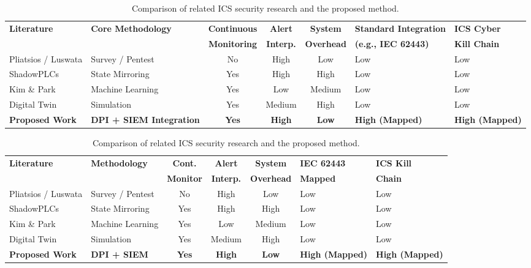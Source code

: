 \begin{table}[htbp]
\centering
\small %
\begin{tabular}{p{2.5cm} p{3cm} c c c p{3cm} p{2cm}}
\hline
\textbf{Literature} & \textbf{Core Methodology} & \textbf{Continuous} & \textbf{Alert} & \textbf{System} & \textbf{Standard Integration} & \textbf{ICS Cyber} \\ 
 & & \textbf{Monitoring} & \textbf{Interp.} & \textbf{Overhead} & \textbf{(e.g., IEC 62443)} & \textbf{Kill Chain} \\ \hline
Pliatsios \cite{ref_report25} / Luswata \cite{ref_report27} & Survey / Pentest & No & High & Low & Low & Low \\ 
ShadowPLCs \cite{ref_report28} & State Mirroring & Yes & High & High & Low & Low \\ 
Kim \& Park \cite{ref_report29} & Machine Learning & Yes & Low & Medium & Low & Low \\ 
Digital Twin \cite{ref_report30} & Simulation & Yes & Medium & High & Low & Low \\ \hline
\textbf{Proposed Work} & \textbf{DPI + SIEM Integration} & \textbf{Yes} & \textbf{High} & \textbf{Low} & \textbf{High (Mapped)} & \textbf{High (Mapped)} \\ \hline
\end{tabular}

\begin{table}[htbp]
\centering
\small
\setlength{\tabcolsep}{3pt} %
\begin{tabular}{@{} p{2.8cm} p{2.5cm} c c c p{2.3cm} p{2cm} @{}} %
\hline
\textbf{Literature} & \textbf{Methodology} & \textbf{Cont.} & \textbf{Alert} & \textbf{System} & \textbf{IEC 62443} & \textbf{ICS Kill} \\
 & & \textbf{Monitor} & \textbf{Interp.} & \textbf{Overhead} & \textbf{Mapped} & \textbf{Chain} \\ \hline
Pliatsios \cite{ref_report25} / \newline Luswata \cite{ref_report27} & Survey / Pentest & No & High & Low & Low & Low \\ 
ShadowPLCs \cite{ref_report28} & State Mirroring & Yes & High & High & Low & Low \\ 
Kim \& Park \cite{ref_report29} & Machine Learning & Yes & Low & Medium & Low & Low \\ 
Digital Twin \cite{ref_report30} & Simulation & Yes & Medium & High & Low & Low \\ \hline
\textbf{Proposed Work} & \textbf{DPI + SIEM} & \textbf{Yes} & \textbf{High} & \textbf{Low} & \textbf{High (Mapped)} & \textbf{High (Mapped)} \\ \hline
\end{tabular}

\caption{Comparison of related ICS security research and the proposed method.}
\label{tab:comparison}
\end{table}

\caption{Comparison of related ICS security research and the proposed method.}
\label{tab:comparison}
\end{table}

